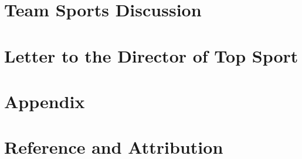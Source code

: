 \documentclass[12pt]{article}
\begin{document}
\newpage

\section{Team Sports Discussion}


\newpage

\section{Letter to the Director of Top Sport}



\section{Appendix}


\newpage

\section{Reference and Attribution}

\end{document}
